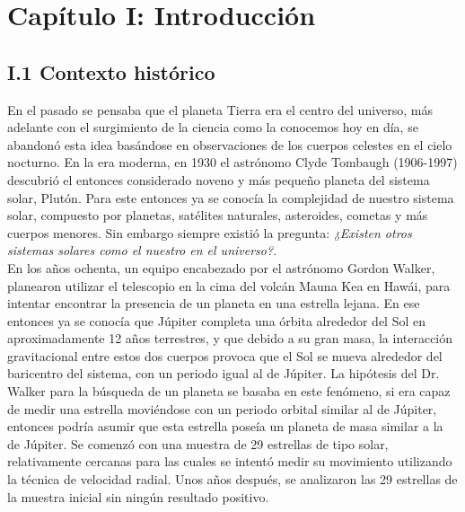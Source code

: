 \chapter*{\textbf{Capítulo I: Introducción}}
\setcounter{chapter}{1}
\setcounter{equation}{0}
\setcounter{figure}{0}
\setcounter{table}{0}

\section*{I.1 Contexto histórico}

En el pasado se pensaba que el planeta Tierra era el centro del universo, más adelante con el surgimiento de la ciencia como la conocemos hoy en día, se abandonó esta idea basándose en observaciones de los cuerpos celestes en el cielo nocturno. En la era moderna, en 1930 el astrónomo Clyde Tombaugh (1906-1997) descubrió el entonces considerado noveno y más pequeño planeta del sistema solar, Plutón. Para este entonces ya se conocía la complejidad de nuestro sistema solar, compuesto por planetas, satélites naturales, asteroides, cometas y más cuerpos menores. Sin embargo siempre existió la pregunta: \textit{¿Existen otros sistemas solares como el nuestro en el universo?}.\\

En los años ochenta, un equipo encabezado por el astrónomo Gordon Walker, planearon utilizar el telescopio en la cima del volcán Mauna Kea en Hawái, para intentar encontrar la presencia de un planeta en una estrella lejana. En ese entonces ya se conocía que Júpiter completa una órbita alrededor del Sol en aproximadamente 12 años terrestres, y que debido a su gran masa, la interacción gravitacional entre estos dos cuerpos provoca que el Sol se mueva alrededor del baricentro del sistema, con un periodo igual al de Júpiter. La hipótesis del Dr. Walker para la búsqueda de un planeta se basaba en este fenómeno, si era capaz de medir una estrella moviéndose con un periodo orbital similar al de Júpiter, entonces podría asumir que esta estrella poseía un planeta de masa similar a la de Júpiter. Se comenzó con una muestra de 29 estrellas de tipo solar, relativamente cercanas para las cuales se intentó medir su movimiento utilizando la técnica de velocidad radial. Unos años después, se analizaron las 29 estrellas de la muestra inicial sin ningún resultado positivo.\\ 

